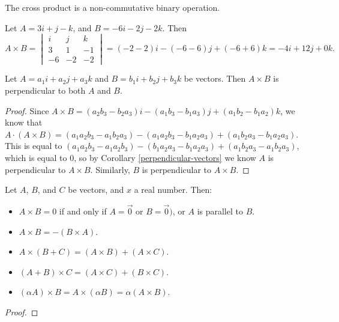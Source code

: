 \documentclass[12pt]{article}
\begin{document}
\begin{rmk}
    The cross product is a non-commutative binary operation.
\end{rmk}

\begin{exmp}
    Let $A = 3i + j - k$, and $B = -6i - 2j - 2k$. Then \[A \times B =
    \begin{vmatrix}
        i & j & k \\ 3 & 1 & -1 \\ -6 & -2 & -2
    \end{vmatrix} = (-2 - 2)i - (-6 - 6)j + (-6 + 6)k = -4i + 12j + 0k.\]
\end{exmp}

\begin{thm}
    Let $A = a_1i + a_2j + a_3k$ and $B = b_1i + b_2j + b_3k$ be vectors. Then $A \times B$ is perpendicular to both $A$ and $B$.
\end{thm}

\begin{proof}
    Since $A \times B = (a_2b_3 - b_2a_3)i - (a_1b_3 - b_1a_3)j + (a_1b_2 - b_1a_2)k$, we know that $A \cdot (A \times B) = (a_1a_2b_3 - a_1b_2a_3) - (a_1a_2b_3 - b_1a_2a_3) + (a_1b_2a_3 - b_1a_2a_3)$. This is equal to $(a_1a_2b_3 - a_1a_2b_3) - (b_1a_2a_3 - b_1a_2a_3) + (a_1b_2a_3 - a_1b_2a_3)$, which is equal to $0$, so by Corollary \ref{perpendicular-vectors} we know $A$ is perpendicular to $A \times B$. Similarly, $B$ is perpendicular to $A \times B$.
\end{proof}

\begin{thm}
    Let $A$, $B$, and $C$ be vectors, and $x$ a real number. Then:
    \begin{itemize}
        \item $A \times B = 0$ if and only if $A = \vec{0}$ or $B = \vec{0})$, or $A$ is parallel to $B$.
        \item $A \times B = -(B \times A)$.
        \item $A \times (B + C) = (A \times B) + (A \times C)$.
        \item $(A + B) \times C = (A \times C) + (B \times C)$.
        \item $(\alpha A) \times B = A \times (\alpha B) = \alpha(A \times B)$.
    \end{itemize}
\end{thm}

\begin{proof}

\end{proof}
\end{document}
